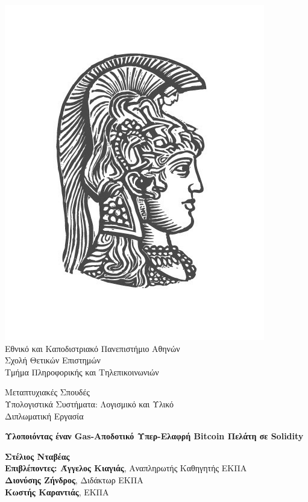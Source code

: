 \begin{center}

    \includegraphics[scale=0.8]{figures/logo_uoa.jpg}\\
    {\large Εθνικό και Καποδιστριακό Πανεπιστήμιο Αθηνών \\
    Σχολή Θετικών Επιστημών \\
    Τμήμα Πληροφορικής και Τηλεπικοινωνιών\\}
    \vspace{1cm}
    \begin{LARGE}
        Μεταπτυχιακές Σπουδές \\
        Υπολογιστικά Συστήματα: Λογισμικό και Υλικό\\
        \vspace{10mm}
        {Διπλωματική Εργασία}\\
        \vspace{0.8cm}
    \end{LARGE}
    {\textbf{\LARGE Υλοποιόντας έναν Gas-Αποδοτικό Υπερ-Ελαφρή Bitcoin Πελάτη σε Solidity}}\\
    \vspace{2.5cm}


    \textbf{\large Στέλιος Νταβέας} \\
    \vspace{2.5cm}
    \textbf{\large Επιβλέποντες: Άγγελος Κιαγιάς}\large , Αναπληρωτής Καθηγητής ΕΚΠΑ\\
    \hspace{0.77cm}
    \textbf{\large Διονύσης Ζήνδρος}\large, Διδάκτωρ ΕΚΠΑ\\
    \hspace{0.77cm}
    \textbf{\large Κωστής Καραντιάς}\large, ΕΚΠΑ
    \vspace{2cm}

    \date{Αθήνα, \\ Ιούνιος 2020}
    \pagebreak
\end{center}
